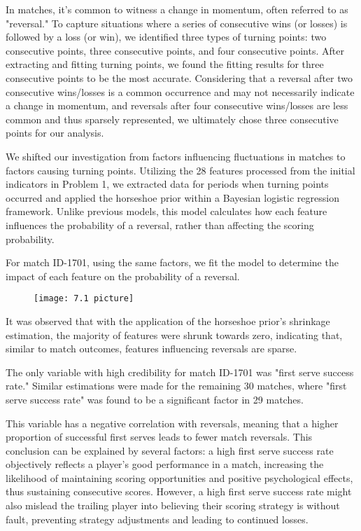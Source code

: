 \documentclass{mcmthesis}
\begin{document}
In matches, it's common to witness a change in momentum, often referred to as "reversal." To capture situations where a series of consecutive wins (or losses) is followed by a loss (or win), we identified three types of turning points: two consecutive points, three consecutive points, and four consecutive points. After extracting and fitting turning points, we found the fitting results for three consecutive points to be the most accurate. Considering that a reversal after two consecutive wins/losses is a common occurrence and may not necessarily indicate a change in momentum, and reversals after four consecutive wins/losses are less common and thus sparsely represented, we ultimately chose three consecutive points for our analysis.

We shifted our investigation from factors influencing fluctuations in matches to factors causing turning points. Utilizing the 28 features processed from the initial indicators in Problem 1, we extracted data for periods when turning points occurred and applied the horseshoe prior within a Bayesian logistic regression framework. Unlike previous models, this model calculates how each feature influences the probability of a reversal, rather than affecting the scoring probability.

For match ID-1701, using the same factors, we fit the model to determine the impact of each feature on the probability of a reversal.
\begin{figure}[ht]%
  \small
  \centering
  \texttt{[image: 7.1 picture]}
\end{figure}
It was observed that with the application of the horseshoe prior's shrinkage estimation, the majority of features were shrunk towards zero, indicating that, similar to match outcomes, features influencing reversals are sparse.

The only variable with high credibility for match ID-1701 was "first serve success rate." Similar estimations were made for the remaining 30 matches, where "first serve success rate" was found to be a significant factor in 29 matches.

This variable has a negative correlation with reversals, meaning that a higher proportion of successful first serves leads to fewer match reversals. This conclusion can be explained by several factors: a high first serve success rate objectively reflects a player's good performance in a match, increasing the likelihood of maintaining scoring opportunities and positive psychological effects, thus sustaining consecutive scores. However, a high first serve success rate might also mislead the trailing player into believing their scoring strategy is without fault, preventing strategy adjustments and leading to continued losses.
\end{document}
